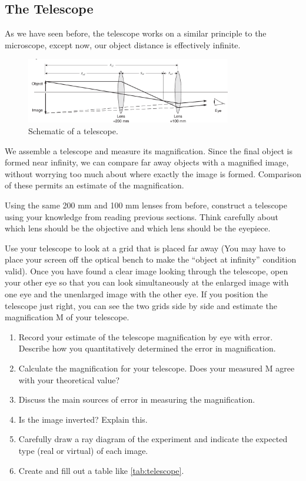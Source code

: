\subsection{The Telescope}
As we have seen before, the telescope works on a similar principle to the microscope, except now, our object distance is effectively infinite.
\myskip
\begin{figure}[h]
\centering
\includegraphics[width=0.8\textwidth]{./Exp7/pic/image10a.png}
\caption{Schematic of a telescope.}
\end{figure}

We assemble a telescope and measure its magnification. Since the final object is formed near infinity, we can compare far away objects with a magnified image, without worrying too much about where exactly the image is formed. Comparison of these permits an estimate of the magnification.\myskip

Using the same 200 mm and 100 mm lenses from before, construct a telescope using your knowledge from reading previous sections. Think carefully about which lens should be the objective and which lens should be the eyepiece.\myskip

Use your telescope to look at a grid that is placed far away (You may have to place your screen off the optical bench to make the ``object at infinity'' condition valid). Once you have found a clear image looking through the telescope, open your other eye so that you can look simultaneously at the enlarged image with one eye and the unenlarged image with the other eye. If you position the telescope just right, you can see the two grids side by side and estimate the magnification M of your telescope.

\begin{enumerate}
  \item Record your estimate of the telescope magnification by eye with error. Describe how you quantitatively determined the error in magnification.

  \item Calculate the magnification for your telescope. Does your measured M agree with your theoretical value?

  \item Discuss the main sources of error in measuring the magnification.

  \item Is the image inverted? Explain this.

  \item Carefully draw a ray diagram of the experiment and indicate the expected type (real or virtual) of each image.

  \item Create and fill out a table like \ref{tab:telescope}.

\end{enumerate}

